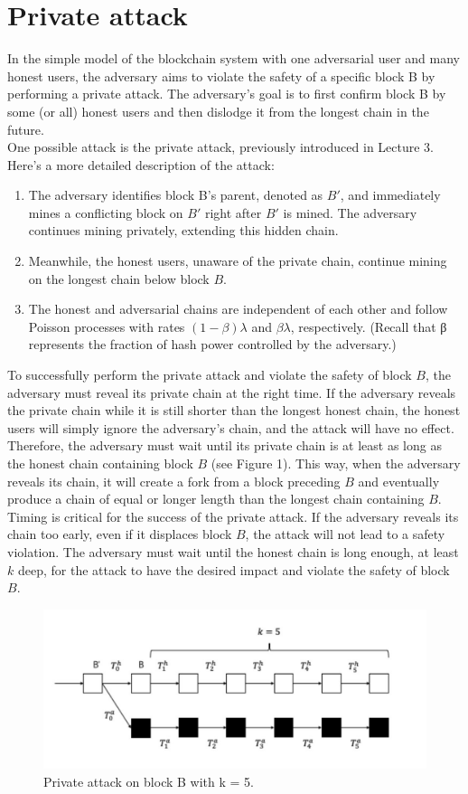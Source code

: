 \documentclass{report}
\begin{document}
\section{Private attack}
In the simple model of the blockchain system with one adversarial user and many honest users, the adversary aims to violate the safety of a specific block B by performing a private attack. The adversary's goal is to first confirm block B by some (or all) honest users and then dislodge it from the longest chain in the future.\\
One possible attack is the private attack, previously introduced in Lecture 3. Here's a more detailed description of the attack:
\begin{enumerate}
	\item The adversary identifies block B's parent, denoted as $B′$, and immediately mines a conflicting block on $B′$ right after $B′$ is mined. The adversary continues mining privately, extending this hidden chain. 
	\item Meanwhile, the honest users, unaware of the private chain, continue mining on the longest chain below block $B$.
	\item The honest and adversarial chains are independent of each other and follow Poisson processes with rates $(1 − \beta)\lambda$ and $\beta\lambda$, respectively. (Recall that β represents the fraction of hash power controlled by the adversary.)
\end{enumerate}
To successfully perform the private attack and violate the safety of block $B$, the adversary must reveal its private chain at the right time. If the adversary reveals the private chain while it is still shorter than the longest honest chain, the honest users will simply ignore the adversary's chain, and the attack will have no effect.\\
Therefore, the adversary must wait until its private chain is at least as long as the honest chain containing block $B$ (see Figure 1). This way, when the adversary reveals its chain, it will create a fork from a block preceding $B$ and eventually produce a chain of equal or longer length than the longest chain containing $B$.\\
Timing is critical for the success of the private attack. If the adversary reveals its chain too early, even if it displaces block $B$, the attack will not lead to a safety violation. The adversary must wait until the honest chain is long enough, at least $k$ deep, for the attack to have the desired impact and violate the safety of block $B$. 
\begin{figure}[h!]
	\centering
	\includegraphics[width=0.6\linewidth]{Fig/F1}
	\caption{Private attack on block B with k = 5.}
	\label{fig:f1}
\end{figure}
\end{document}
